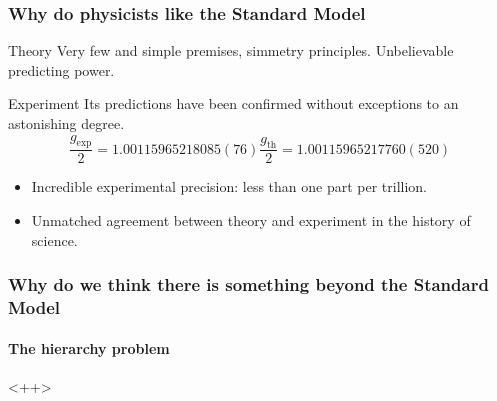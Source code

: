 \documentclass[ukenglish]{beamer}
\begin{document}
\begin{frame}
    \frametitle{Why do physicists like the Standard Model}
    \begin{block}
        {Theory}
        Very few and simple premises, simmetry principles. Unbelievable
        predicting power.
    \end{block}
    \begin{block}
        {Experiment}
        Its predictions have been confirmed without exceptions to an
        astonishing degree.
        \begin{equation*}
            \dfrac{g_{\text{exp}}}{2} = 1.001 159 652 180 85(76)
            \dfrac{g_{\text{th}}}{2} = 1.001 159 652 177 60(520)
        \end{equation*}
        \begin{itemize}
            \item Incredible experimental precision: less than one part per
                trillion.
            \item Unmatched agreement between theory and experiment in the
                history of science.
        \end{itemize}
    \end{block}
\end{frame}

\begin{frame}
    \frametitle{Why do we think there is something beyond the Standard
    Model}
    \framesubtitle{The hierarchy problem}

\end{frame}<++>
\end{document}
